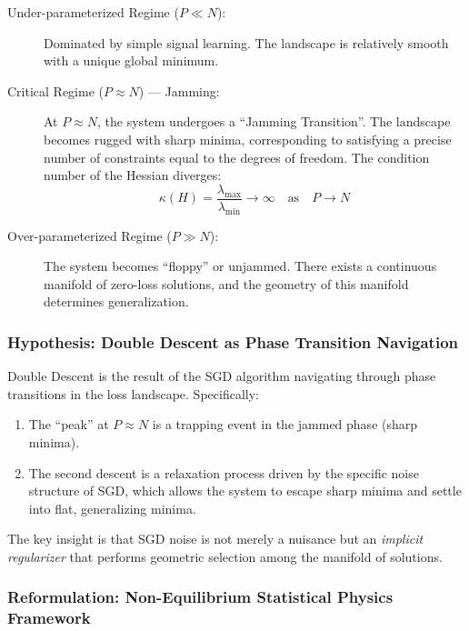 \begin{description}
    \item[Under-parameterized Regime ($P \ll N$):] Dominated by simple signal learning. The landscape is relatively smooth with a unique global minimum.
    
    \item[Critical Regime ($P \approx N$) --- Jamming:] At $P \approx N$, the system undergoes a ``Jamming Transition''. The landscape becomes rugged with sharp minima, corresponding to satisfying a precise number of constraints equal to the degrees of freedom. The condition number of the Hessian diverges:
    \begin{equation}
        \kappa(H) = \frac{\lambda_{\max}}{\lambda_{\min}} \to \infty \quad \text{as} \quad P \to N
    \end{equation}
    
    \item[Over-parameterized Regime ($P \gg N$):] The system becomes ``floppy'' or unjammed. There exists a continuous manifold of zero-loss solutions, and the geometry of this manifold determines generalization.
\end{description}

\subsubsection{Hypothesis: Double Descent as Phase Transition Navigation}

\begin{hypothesis}
Double Descent is the result of the SGD algorithm navigating through phase transitions in the loss landscape. Specifically:
\begin{enumerate}[topsep=1pt,itemsep=1pt]
    \item The ``peak'' at $P \approx N$ is a trapping event in the jammed phase (sharp minima).
    \item The second descent is a relaxation process driven by the specific noise structure of SGD, which allows the system to escape sharp minima and settle into flat, generalizing minima.
\end{enumerate}
\end{hypothesis}

The key insight is that SGD noise is not merely a nuisance but an \textit{implicit regularizer} that performs geometric selection among the manifold of solutions.

\subsubsection{Reformulation: Non-Equilibrium Statistical Physics Framework}

